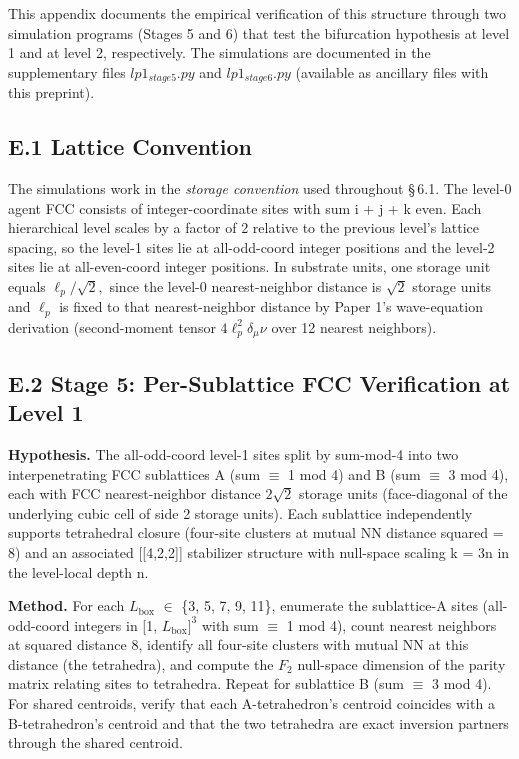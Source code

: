 \documentclass[11pt,oneside]{report}
\theoremstyle{definition}
\theoremstyle{remark}
\begin{document}
This appendix documents the empirical verification of this structure
through two simulation programs (Stages 5 and 6) that test the
bifurcation hypothesis at level 1 and at level 2, respectively. The
simulations are documented in the supplementary files \ensuremath{lp1_{stage5}.py} and
\ensuremath{lp1_{stage6}.py} (available as ancillary files with this preprint).

\subsection*{E.1 Lattice Convention}

The simulations work in the \emph{storage convention} used throughout
\S\,6.1. The level-0 agent FCC consists of integer-coordinate sites with
sum i + j + k even. Each hierarchical level scales by a factor of 2
relative to the previous level's lattice spacing, so the level-1 sites
lie at all-odd-coord integer positions and the level-2 sites lie at
all-even-coord integer positions. In substrate units, one storage unit
equals \ensuremath{\ell_{p}/\sqrt{2},} since the level-0 nearest-neighbor distance is \ensuremath{\sqrt{2}} storage
units and \ensuremath{\ell_{p}} is fixed to that nearest-neighbor distance by Paper 1's
wave-equation derivation (second-moment tensor \ensuremath{4\ell^{2}_{p}\delta_{\mu}\nu} over 12 nearest
neighbors).

\subsection*{E.2 Stage 5: Per-Sublattice FCC Verification at Level 1}

\textbf{Hypothesis.} The all-odd-coord level-1 sites split by sum-mod-4
into two interpenetrating FCC sublattices A (sum \ensuremath{\equiv} 1 mod 4) and B (sum \ensuremath{\equiv}
3 mod 4), each with FCC nearest-neighbor distance \ensuremath{2\sqrt{2}} storage units
(face-diagonal of the underlying cubic cell of side 2 storage units).
Each sublattice independently supports tetrahedral closure (four-site
clusters at mutual NN distance squared = 8) and an associated
[[4,2,2]] stabilizer structure with null-space scaling k = 3n in
the level-local depth n.

\textbf{Method.} For each \ensuremath{L_{\mathrm{box}}} \ensuremath{\in} \{3, 5, 7, 9, 11\}, enumerate the
sublattice-A sites (all-odd-coord integers in [1, \ensuremath{L_{\mathrm{box}}]^{3}} with sum
\ensuremath{\equiv} 1 mod 4), count nearest neighbors at squared distance 8, identify all
four-site clusters with mutual NN at this distance (the tetrahedra), and
compute the \ensuremath{F_{2}} null-space dimension of the parity matrix relating sites
to tetrahedra. Repeat for sublattice B (sum \ensuremath{\equiv} 3 mod 4). For shared
centroids, verify that each A-tetrahedron's centroid coincides with a
B-tetrahedron's centroid and that the two tetrahedra are exact inversion
partners through the shared centroid.
\end{document}

